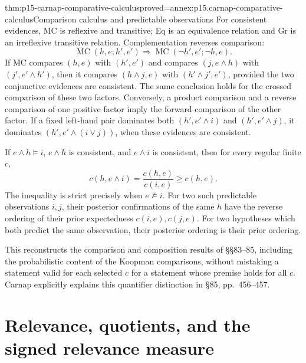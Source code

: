 \begin{hbtheorem}{thm:p15-carnap-comparative-calculus}{proved=annex:p15.carnap-comparative-calculus}{Comparison calculus and predictable observations}
For consistent evidences, MC is reflexive and transitive; Eq is an
equivalence relation and Gr is an irreflexive transitive relation.
Complementation reverses comparison:
\[
 \operatorname{MC}(h,e;h',e')\Longrightarrow
 \operatorname{MC}(\neg h',e';\neg h,e).
\]
If MC compares \((h,e)\) with \((h',e')\) and compares
\((j,e\land h)\) with \((j',e'\land h')\), then it compares
\((h\land j,e)\) with \((h'\land j',e')\), provided the two
conjunctive evidences are consistent. The same conclusion holds for
the crossed comparison of these two factors. Conversely, a product
comparison and a reverse comparison of one positive factor imply the
forward comparison of the other factor. If a fixed left-hand pair
dominates both \((h',e'\land i)\) and \((h',e'\land j)\), it
dominates \((h',e'\land(i\lor j))\), when these evidences are
consistent.

If \(e\land h\models i\), \(e\land h\) is consistent, and
\(e\land i\) is consistent, then for every regular finite \(c\),
\[
 c(h,e\land i)=\frac{c(h,e)}{c(i,e)}\geq c(h,e).
\]
The inequality is strict precisely when \(e\not\models i\).
For two such predictable observations \(i,j\), their posterior
confirmations of the same \(h\) have the reverse ordering of their
prior expectedness \(c(i,e),c(j,e)\). For two hypotheses which
both predict the same observation, their posterior ordering is their
prior ordering.
\end{hbtheorem}

This reconstructs the comparison and composition results of §§83--85,
including the probabilistic content of the Koopman comparisons, without
mistaking a statement valid for each selected \(c\) for a statement
whose premise holds for all \(c\). Carnap explicitly explains this
quantifier distinction in §85, pp.~456--457.

\section{Relevance, quotients, and the signed relevance measure}
\label{sec:p15-carnap-relevance}

